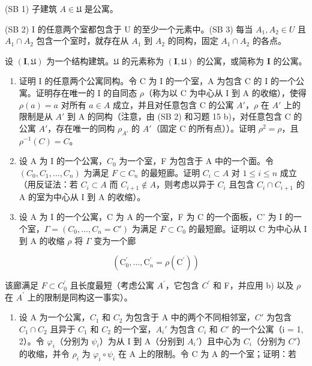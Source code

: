 (SB 1) 子建筑 \(A \in \mathfrak{U}\) 是公寓。

(SB 2) I 的任意两个室都包含于 U 的至少一个元素中。(SB 3) 每当 \(A_{1}, A_{2} \in U\) 且 \(A_{1} \cap A_{2}\) 包含一个室时，就存在从 \(A_{1}\) 到 \(A_{2}\) 的同构，固定 \(A_{1} \cap A_{2}\) 的各点。

设 \((\mathbf{I},\mathfrak{U})\) 为一个结构建筑。\(\mathfrak{U}\) 的元素称为 \((\mathbf{I},\mathfrak{U})\) 的公寓，或简称为 \(\mathbf{I}\) 的公寓。

\begin{enumerate}
\def\labelenumi{\alph{enumi})}
\item
  证明 I 的任意两个公寓同构。令 C 为 I 的一个室，A 为包含 C 的 I 的一个公寓。证明存在唯一的 I 的自同态 \(\rho\)（称为以 C 为中心从 I 到 A 的收缩），使得 \(\rho(a)=a\) 对所有 \(a\in A\) 成立，并且对任意包含 C 的公寓 \(A'\)，\(\rho\) 在 \(A'\) 上的限制是从 \(A'\) 到 A 的同构（注意，由 (SB 2) 和习题 15 b)，对任意包含 C 的公寓 \(A'\)，存在唯一的同构 \(\rho_{A'}\) 的 \(A'\)（固定 C 的所有点））。证明 \(\rho^{2}=\rho\)，且 \(\rho^{-1}(C)=C\)。
\item
  设 A 为 I 的一个公寓，\(C_{0}\) 为一个室，F 为包含于 A 中的一个面。令 \((C_{0}, C_{1}, \ldots, C_{n})\) 为满足 \(F \subset C_{n}\) 的最短廊。证明 \(C_{i} \subset A\) 对 \(1 \leqslant i \leqslant n\) 成立（用反证法：若 \(C_{i} \subset A\) 而 \(C_{i+1} \notin A\)，则考虑以异于 \(C_{i}\) 且包含 \(C_{i} \cap C_{i+1}\) 的 A 的室为中心从 I 到 A 的收缩）。
\item
  设 A 为 I 的一个公寓，C 为 A 的一个室，F 为 C 的一个面板，C' 为 I 的一个室，\(\Gamma = (C_0, \ldots, C_n = C')\) 为满足 \(F \subset C_0\) 的最短廊。证明以 C 为中心从 I 到 A 的收缩 \(\rho\) 将 \(\Gamma\) 变为一个廊
\end{enumerate}

\[
\left(\mathrm{C} _ {0} ^ {\prime}, \dots , \mathrm{C} _ {n} ^ {\prime} = \rho (\mathrm{C} ^ {\prime})\right)
\]

该廊满足 \(F \subset C_{0}^{\prime}\) 且长度最短（考虑公寓 \(A^{\prime}\)，它包含 \(C^{\prime}\) 和 F，并应用 b) 以及 \(\rho\) 在 \(A^{\prime}\) 上的限制是同构这一事实）。

\begin{enumerate}
\def\labelenumi{\alph{enumi})}
\setcounter{enumi}{3}
\tightlist
\item
  设 A 为一个公寓，\(C_{1}\) 和 \(C_{2}\) 为包含于 A 中的两个不同相邻室，\(C'\) 为包含 \(C_{1} \cap C_{2}\) 且异于 \(C_{1}\) 和 \(C_{2}\) 的一个室，\(A_{i}'\) 为包含 \(C_{i}\) 和 \(C'\) 的一个公寓（i = 1, 2）。令 \(\varphi_{i}\)（分别为 \(\psi_{i}\)）为从 I 到 A（分别到 \(A_{i}'\)）且中心为 \(C_{i}\)（分别为 \(C'\)）的收缩，并令 \(\rho_{i}\) 为 \(\varphi_{i} \circ \psi_{i}\) 在 A 上的限制。令 C 为 A 的一个室；证明：若
\end{enumerate}

